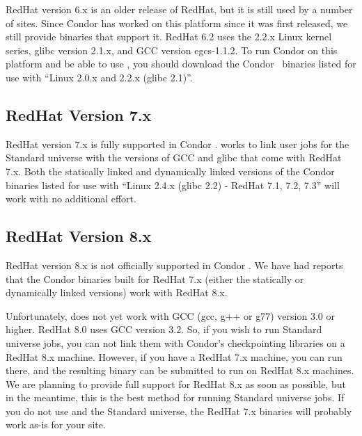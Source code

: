 RedHat version 6.x is an older release of RedHat, but it is still used
by a number of sites.
Since Condor has worked on this platform since it was first released,
we still provide binaries that support it.
RedHat 6.2 uses the 2.2.x Linux kernel series, glibc version 2.1.x,
and GCC version egcs-1.1.2.
To run Condor on this platform and be able to use ,
you should download the Condor \VersionNotice\  binaries listed for use
with ``Linux 2.0.x and 2.2.x (glibc 2.1)''.


\subsection{\label{sec:platform-linux-rh7}RedHat Version 7.x}

RedHat version 7.x is fully supported in Condor \VersionNotice.
 works to link user jobs for the Standard universe
with the versions of GCC and glibc that come with RedHat 7.x.
Both the statically linked and dynamically linked versions of the
Condor binaries listed for use with ``Linux 2.4.x (glibc 2.2) - RedHat
7.1, 7.2, 7.3'' will work with no additional effort.


\subsection{\label{sec:platform-linux-rh8}RedHat Version 8.x}

RedHat version 8.x is not officially supported in Condor
\VersionNotice.
We have had reports that the Condor binaries built for RedHat 7.x
(either the statically or dynamically linked versions) work with
RedHat 8.x. 

Unfortunately,  does not yet work with GCC (gcc, g++
or g77) version 3.0 or higher.
RedHat 8.0 uses GCC version 3.2.
So, if you wish to run Standard universe jobs, you can not link them
with Condor's checkpointing libraries on a RedHat 8.x machine.
However, if you have a RedHat 7.x machine, you can run
 there, and the resulting binary can be submitted to
run on RedHat 8.x machines.
We are planning to provide full support for RedHat 8.x as soon as
possible, but in the meantime, this is the best method for running
Standard universe jobs.
If you do not use  and the Standard universe, the
RedHat 7.x binaries will probably work as-is for your site. 


